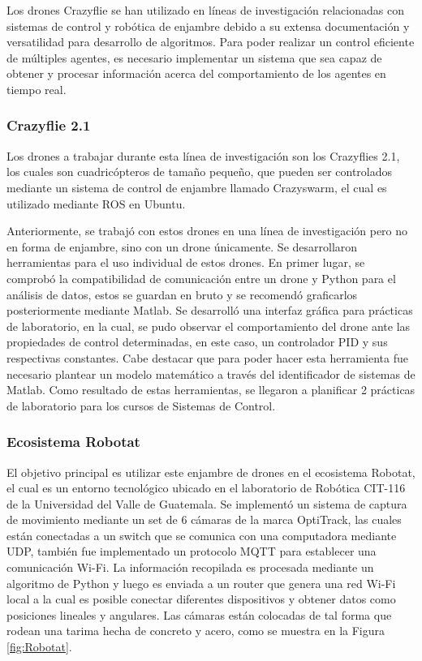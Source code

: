 Los drones Crazyflie se han utilizado en líneas de investigación relacionadas con sistemas de control y robótica de enjambre debido a su extensa documentación y versatilidad para desarrollo de algoritmos. Para poder realizar un control eficiente de múltiples agentes, es necesario implementar un sistema que sea capaz de obtener y procesar información acerca del comportamiento de los agentes en tiempo real.
\subsubsection*{Crazyflie 2.1}

Los drones a trabajar durante esta línea de investigación son los Crazyflies 2.1, los cuales son cuadricópteros de tamaño pequeño, que pueden ser controlados mediante un sistema de control de enjambre llamado Crazyswarm, el cual es utilizado mediante ROS en Ubuntu. 

Anteriormente, se trabajó con estos drones en una línea de investigación pero no en forma de enjambre, sino con un drone únicamente. Se desarrollaron herramientas para el uso individual de estos drones. En primer lugar, se comprobó la compatibilidad de comunicación entre un drone y Python para el análisis de datos, estos se guardan en bruto y se recomendó graficarlos posteriormente mediante Matlab. Se desarrolló una interfaz gráfica para prácticas de laboratorio, en la cual, se pudo observar el comportamiento del drone ante las propiedades de control determinadas, en este caso, un controlador PID y sus respectivas constantes. Cabe destacar que para poder hacer esta herramienta fue necesario plantear un modelo matemático a través del identificador de sistemas de Matlab. Como resultado de estas herramientas, se llegaron a planificar 2 prácticas de laboratorio para los cursos de Sistemas de Control. \cite{Sanabria2022_tesis}

\subsubsection*{Ecosistema Robotat}

El objetivo principal es utilizar este enjambre de drones en el ecosistema Robotat, el cual es un entorno tecnológico ubicado en el laboratorio de Robótica CIT-116 de la Universidad del Valle de Guatemala. \cite{Camilo2022_tesis}Se implementó un sistema de captura de movimiento mediante un set de 6 cámaras de la marca OptiTrack, las cuales están conectadas a un switch que se comunica con una computadora mediante UDP, también fue implementado un protocolo MQTT para establecer una comunicación Wi-Fi. La información recopilada es procesada mediante un algoritmo de Python y luego es enviada a un router que genera una red Wi-Fi local a la cual es posible conectar diferentes dispositivos y obtener datos como posiciones lineales y angulares. Las cámaras están colocadas de tal forma que rodean una tarima hecha de concreto y acero, como se muestra en la Figura \ref{fig:Robotat}. 

